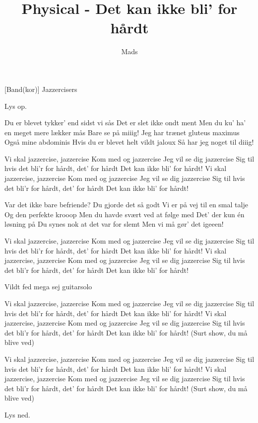 \documentclass{ucph-revy}
\author{Mads}
\title{Physical - Det kan ikke bli' for hårdt}
\begin{document}
\maketitle
	\begin{roles}
		[Band(kor)] Jazzercisers
	\end{roles}

	

\begin{song}

\scene Lys op.

 Du er blevet tykker’ end sidst vi sås
Det er slet ikke ondt ment
Men du ku’ ha’ en meget mere lækker mås
Bare se på miiig!
Jeg har trænet gluteus maximus
Også mine abdominis
Hvis du er blevet helt vildt jaloux
Så har jeg noget til diiig!



Vi skal jazzercise, jazzercise
Kom med og jazzercise
Jeg vil se dig jazzercise
Sig til hvis det bli’r for hårdt, det’ for hårdt
Det kan ikke bli’ for hårdt!
Vi skal jazzercise, jazzercise
Kom med og jazzercise
Jeg vil se dig jazzercise
Sig til hvis det bli’r for hårdt, det’ for hårdt
Det kan ikke bli’ for hårdt!



Var det ikke bare befriende?
Du gjorde det så godt
Vi er på vej til en smal talje
Og den perfekte krooop
Men du havde svært ved at følge med
Det’ der kun én løsning på
Du synes nok at det var for slemt
Men vi må gør’ det igeeen!


Vi skal jazzercise, jazzercise
Kom med og jazzercise
Jeg vil se dig jazzercise
Sig til hvis det bli’r for hårdt, det’ for hårdt
Det kan ikke bli’ for hårdt!
Vi skal jazzercise, jazzercise
Kom med og jazzercise
Jeg vil se dig jazzercise
Sig til hvis det bli’r for hårdt, det’ for hårdt
Det kan ikke bli’ for hårdt!

\scene Vildt fed mega sej guitarsolo

Vi skal jazzercise, jazzercise
Kom med og jazzercise
Jeg vil se dig jazzercise
Sig til hvis det bli’r for hårdt, det’ for hårdt
Det kan ikke bli’ for hårdt!
Vi skal jazzercise, jazzercise
Kom med og jazzercise
Jeg vil se dig jazzercise
Sig til hvis det bli’r for hårdt, det’ for hårdt
Det kan ikke bli’ for hårdt!
(Surt show, du må blive ved)

Vi skal jazzercise, jazzercise
Kom med og jazzercise
Jeg vil se dig jazzercise
Sig til hvis det bli’r for hårdt, det’ for hårdt
Det kan ikke bli’ for hårdt!
Vi skal jazzercise, jazzercise
Kom med og jazzercise
Jeg vil se dig jazzercise
Sig til hvis det bli’r for hårdt, det’ for hårdt
Det kan ikke bli’ for hårdt!
(Surt show, du må blive ved)

\scene Lys ned. %

\end{song}
\end{document}

